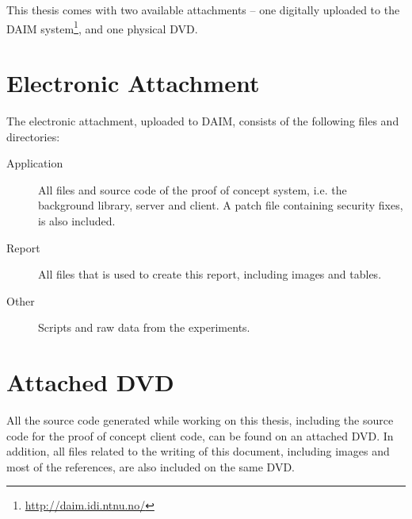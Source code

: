 \documentclass[pdftex,english,10pt,b5paper,twoside]{book}
\begin{document}
This thesis comes with two available attachments -- one digitally uploaded to
the DAIM system\footnote{\url{http://daim.idi.ntnu.no/}}, and one physical DVD.

\section{Electronic Attachment}

The electronic attachment, uploaded to
DAIM, consists of the following files
and directories:

\begin{description}
  \item[Application] All files and source code of the proof of concept system,
    i.e. the background library, server and client. A patch file containing
    security fixes, is also included.
  \item[Report] All files that is used to create this report, including images
    and tables.
  \item[Other] Scripts and raw data from the experiments.
\end{description}

\section{Attached DVD}

All the source code generated while working on this thesis, including the
source code for the proof of concept client code, can be found on an attached
DVD. In addition, all files related to the writing of this document, including
images and most of the references, are also included on the same DVD.
\end{document}

